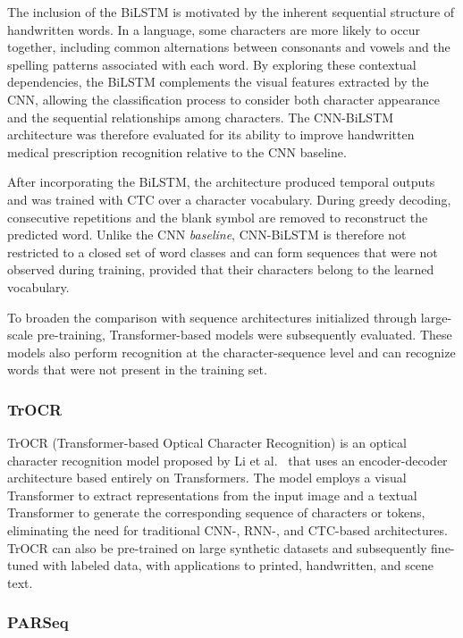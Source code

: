 \documentclass[11pt,a4paper]{article}
\begin{document}
The inclusion of the BiLSTM is motivated by the inherent sequential structure of handwritten words. In a language, some characters are more likely to occur together, including common alternations between consonants and vowels and the spelling patterns associated with each word. By exploring these contextual dependencies, the BiLSTM complements the visual features extracted by the CNN, allowing the classification process to consider both character appearance and the sequential relationships among characters. The CNN-BiLSTM architecture was therefore evaluated for its ability to improve handwritten medical prescription recognition relative to the CNN baseline.

After incorporating the BiLSTM, the architecture produced temporal outputs and was trained with CTC over a character vocabulary. During greedy decoding, consecutive repetitions and the blank symbol are removed to reconstruct the predicted word. Unlike the CNN \textit{baseline}, CNN-BiLSTM is therefore not restricted to a closed set of word classes and can form sequences that were not observed during training, provided that their characters belong to the learned vocabulary.

To broaden the comparison with sequence architectures initialized through large-scale pre-training, Transformer-based models were subsequently evaluated. These models also perform recognition at the character-sequence level and can recognize words that were not present in the training set.


\subsubsection{TrOCR}

TrOCR (Transformer-based Optical Character Recognition) is an optical character recognition model proposed by Li et al.~\cite{li2023trocr} that uses an encoder-decoder architecture based entirely on Transformers. The model employs a visual Transformer to extract representations from the input image and a textual Transformer to generate the corresponding sequence of characters or tokens, eliminating the need for traditional CNN-, RNN-, and CTC-based architectures. TrOCR can also be pre-trained on large synthetic datasets and subsequently fine-tuned with labeled data, with applications to printed, handwritten, and scene text.

\subsubsection{PARSeq}
\end{document}
